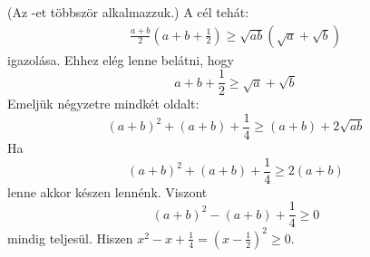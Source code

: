    (Az -et többször alkalmazzuk.)
   A cél tehát:
   \begin{align*}
   \frac{a+b}{2}(a+b+\frac{1}{2}) \ge
   \sqrt{ab}(\sqrt{a}+\sqrt{b})
   \end{align*}
   igazolása. Ehhez elég lenne belátni, hogy
   $$
   a+b+\frac{1}{2} \ge \sqrt{a}+\sqrt{b}
   $$
   Emeljük négyzetre mindkét oldalt:
   $$
   (a+b)^2+(a+b)+\frac{1}{4} \ge (a+b)+2\sqrt{ab} 
   $$
   Ha 
   $$
   (a+b)^2+(a+b)+\frac{1}{4} \ge 2(a+b)
   $$
   lenne akkor készen lennénk. Viszont
   $$
   (a+b)^2-(a+b)+\frac{1}{4} \ge 0
   $$
   mindig teljesül. Hiszen $x^2-x+\frac{1}{4}=(x-\frac{1}{2})^2 \ge 0.$
